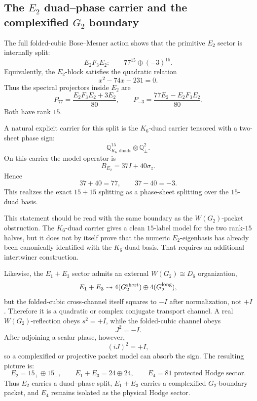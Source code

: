 \subsection{The \texorpdfstring{$E_2$}{E2} duad--phase carrier and the complexified \texorpdfstring{$G_2$}{G2} boundary}
\label{subsec:bt633-e2-duad-phase-carrier}

The full folded-cubic Bose--Mesner action shows that the primitive \(E_2\) sector is internally split:
\[
E_2F_3E_2:\qquad 77^{15}\oplus(-3)^{15}.
\]
Equivalently, the \(E_2\)-block satisfies the quadratic relation
\[
\boxed{x^2-74x-231=0.}
\]
Thus the spectral projectors inside \(E_2\) are
\[
\boxed{P_{77}=\frac{E_2F_3E_2+3E_2}{80},}
\qquad
\boxed{P_{-3}=\frac{77E_2-E_2F_3E_2}{80}.}
\]
Both have rank \(15\).

A natural explicit carrier for this split is the \(K_6\)-duad carrier tensored with a two-sheet phase sign:
\[
\boxed{
\mathbb Q^{15}_{K_6\text{ duads}}\otimes \mathbb Q^2_{\pm}.
}
\]
On this carrier the model operator is
\[
\boxed{B_{E_2}=37I+40\sigma_z.}
\]
Hence
\[
37+40=77,
\qquad
37-40=-3.
\]
This realizes the exact \(15+15\) splitting as a phase-sheet splitting over the \(15\)-duad basis.

This statement should be read with the same boundary as the \(W(G_2)\)-packet obstruction.  The \(K_6\)-duad carrier gives a clean \(15\)-label model for the two rank-\(15\) halves, but it does not by itself prove that the numeric \(E_2\)-eigenbasis has already been canonically identified with the \(K_6\)-duad basis.  That requires an additional intertwiner construction.

Likewise, the \(E_1+E_3\) sector admits an external \(W(G_2)\cong D_6\) organization,
\[
E_1+E_3\leadsto4(G_2^{\rm short})\oplus4(G_2^{\rm long}),
\]
but the folded-cubic cross-channel itself squares to \(-I\) after normalization, not \(+I\).  Therefore it is a quadratic or complex conjugate transport channel.  A real \(W(G_2)\)-reflection obeys \(s^2=+I\), while the folded-cubic channel obeys
\[
\boxed{J^2=-I.}
\]
After adjoining a scalar phase, however,
\[
\boxed{(iJ)^2=+I,}
\]
so a complexified or projective packet model can absorb the sign.  The resulting picture is:
\[
\boxed{
E_2=15_+\oplus15_-,
\qquad
E_1+E_3=24\oplus24,
\qquad
E_4=81\text{ protected Hodge sector}.
}
\]
Thus \(E_2\) carries a duad--phase split, \(E_1+E_3\) carries a complexified \(G_2\)-boundary packet, and \(E_4\) remains isolated as the physical Hodge sector.
